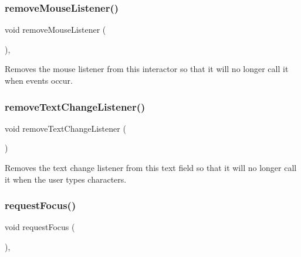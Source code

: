 \subsubsection{\texorpdfstring{remove\+Mouse\+Listener()}{removeMouseListener()}}
{\footnotesize\ttfamily void remove\+Mouse\+Listener (\begin{DoxyParamCaption}{ }\end{DoxyParamCaption})\hspace{0.3cm}{\ttfamily [virtual]}, {\ttfamily [inherited]}}



Removes the mouse listener from this interactor so that it will no longer call it when events occur. 

\mbox{\label{classGTextField_a69c940b99d01eb7c353763ce4b0942a4}} 
\subsubsection{\texorpdfstring{remove\+Text\+Change\+Listener()}{removeTextChangeListener()}}
{\footnotesize\ttfamily void remove\+Text\+Change\+Listener (\begin{DoxyParamCaption}{ }\end{DoxyParamCaption})\hspace{0.3cm}{\ttfamily [virtual]}}



Removes the text change listener from this text field so that it will no longer call it when the user types characters. 

\mbox{\label{classGInteractor_a519fb2ac767f8b2febbb50b898b8c8cb}} 
\subsubsection{\texorpdfstring{request\+Focus()}{requestFocus()}}
{\footnotesize\ttfamily void request\+Focus (\begin{DoxyParamCaption}{ }\end{DoxyParamCaption})\hspace{0.3cm}{\ttfamily [virtual]}, {\ttfamily [inherited]}}




